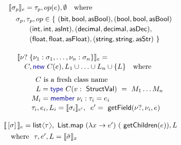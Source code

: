 \documentclass[preprint]{sigplanconf}
\newcommand{\langl}{\begin{picture}(4.5,7)
\put(1.1,2.5){\rotatebox{60}{\line(1,0){5.5}}}
\put(1.1,2.5){\rotatebox{300}{\line(1,0){5.5}}}
\end{picture}}
\newcommand{\rangl}{\begin{picture}(4.5,7)
\put(.9,2.5){\rotatebox{120}{\line(1,0){5.5}}}
\put(.9,2.5){\rotatebox{240}{\line(1,0){5.5}}}
\end{picture}}
\newcommand{\kvd}[1]{\textnormal{\textcolor{kvdclr}{\sffamily #1}}}
\newcommand{\ident}[1]{\textnormal{\sffamily #1}}
\newcommand{\sem}[1]{\llbracket #1 \rrbracket}
\begin{document}
\begin{figure}
\begin{multicols}{2}
\noindent
\begin{equation*}
\begin{array}{l}
 \sem{\sigma_p}_e = \tau_p,op(e),\emptyset\quad\textnormal{where} \\[0.4em]
\quad\sigma_p, \tau_p, op\in  \{~ (\ident{bit}, \ident{bool}, \ident{asBool}),  (\ident{bool}, \ident{bool}, \ident{asBool})\\[0.2em]
\hspace{2.9em} (\ident{int}, \ident{int}, \ident{asInt}), (\ident{decimal},\ident{decimal},\ident{asDec}),\\[0.2em]
\hspace{2.9em} (\ident{float},\ident{float},\ident{asFloat}), (\ident{string},\ident{string},\ident{asStr}) ~\}\\[0.6em]
\end{array}
\end{equation*}
%
\begin{equation*}
\begin{array}{l}
 \sem{\nu?\; \{ \nu_1 : \sigma_1, \ldots, \nu_n : \sigma_n \}}_e = \\[0.1em]
 \quad C, \kvd{new}~C(e), L_1\cup\ldots\cup L_n\cup\{ L \}\quad\textnormal{where}\\[0.6em]
 \qquad \;\;C~\textnormal{is a fresh class name} \\[0.1em]
 \qquad \;\,\,L = \kvd{type}~C(v:\ident{StructVal})~=~M_1\ldots M_n  \\[0.1em]
 \qquad M_i = \kvd{member}~\nu_i:\tau_i=e_i\\[0.1em]
 \qquad \tau_i, e_i, L_i = \sem{\sigma_i}_{e'},\;\; e'=\ident{getField}(\nu?, \nu_i, e)\\[0.6em]
\end{array}
\end{equation*}
%
\begin{equation*}
\begin{array}{l}
 \sem{\,[\sigma]\,}_e = \ident{list}\langl\tau\rangl, \ident{List.map}~(\lambda x\rightarrow e')~(\ident{getChildren}(e)), L\\[0.4em]
 \quad \textnormal{where}~~\tau, e', L = \sem{\hat{\sigma}}_x
\end{array}
\end{equation*}


\end{multicols}
\end{figure}
\end{document}
